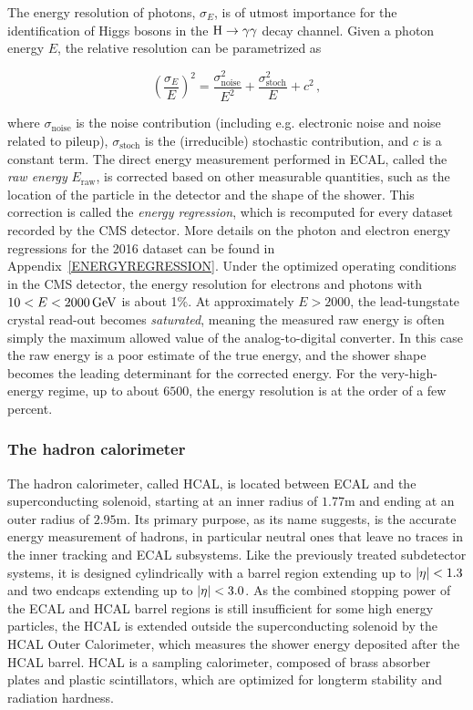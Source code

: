The energy resolution of photons, $\sigma_E$, is of utmost importance for the identification of Higgs bosons in the $\mathrm{H}\to\mathrm{\gamma}\mathrm{\gamma}$ decay channel.
% 
Given a photon energy $E$, the relative resolution can be parametrized as~\cite{CMS:1997ysd}
% 
\begin{linenomath}
\begin{equation}
\left( \frac{\sigma_E}{E} \right)^2 =
    \frac{\sigma_\text{noise}^2}{E^2}
    + \frac{\sigma_\text{stoch}^2}{E}
    + c^2
\,,
\end{equation}
\end{linenomath}
% 
where $\sigma_\text{noise}$ is the noise contribution (including e.g. electronic noise and noise related to pileup), $\sigma_\text{stoch}$ is the (irreducible) stochastic contribution, and $c$ is a constant term.
% 
The direct energy measurement performed in ECAL, called the \textit{raw energy} $E_\text{raw}$, is corrected based on other measurable quantities, such as the location of the particle in the detector and the shape of the shower.
% 
This correction is called the \textit{energy regression}, which is recomputed for every dataset recorded by the CMS detector.
% 
More details on the photon and electron energy regressions for the 2016 dataset can be found in Appendix~\ref{ENERGYREGRESSION}.
% 
Under the optimized operating conditions in the CMS detector, the energy resolution for electrons and photons with $10 < E < 2000\,\text{GeV}$ is about 1\%.
% 
At approximately $E > 2000$\GeV, the lead-tungstate crystal read-out becomes \textit{saturated}, meaning the measured raw energy is often simply the maximum allowed value of the analog-to-digital converter.
% 
In this case the raw energy is a poor estimate of the true energy, and the shower shape becomes the leading determinant for the corrected energy.
% 
For the very-high-energy regime, up to about $6500$\GeV, the energy resolution is at the order of a few percent.



\subsubsection{The hadron calorimeter}

The hadron calorimeter, called HCAL, is located between ECAL and the superconducting solenoid, starting at an inner radius of $1.77$\unit{m} and ending at an outer radius of $2.95$\unit{m}.
% 
Its primary purpose, as its name suggests, is the accurate energy measurement of hadrons, in particular neutral ones that leave no traces in the inner tracking and ECAL subsystems.
% 
Like the previously treated subdetector systems, it is designed cylindrically with a barrel region extending up to $\left| \eta \right | < 1.3$ and two endcaps extending up to $\left| \eta \right | < 3.0$.
% 
As the combined stopping power of the ECAL and HCAL barrel regions is still insufficient for some high energy particles, the HCAL is extended outside the superconducting solenoid by the HCAL Outer Calorimeter, which measures the shower energy deposited after the HCAL barrel.
% 
HCAL is a sampling calorimeter, composed of brass absorber plates and plastic scintillators, which are optimized for longterm stability and radiation hardness.


